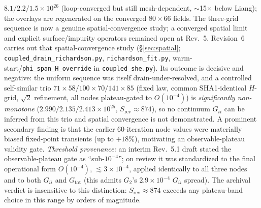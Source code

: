 \documentclass[11pt]{article}
\begin{document}
$8.1/2.2/1.5\times10^{26}$ (loop-converged but still mesh-dependent, $\sim$15$\times$ below Liang);
the overlays are regenerated on the converged $80{\times}66$ fields. The three-grid sequence is now
a genuine spatial-convergence study; a converged spatial limit and explicit surface/impurity
operators remained open at Rev.~5.
Revision~6 carries out that spatial-convergence study (\S\ref{sec:spatial};
\texttt{coupled\_drain\_richardson.py}, \texttt{richardson\_fit.py}, warm-start/\texttt{phi\_span\_H\_override}
in \texttt{coupled\_she.py}). Its outcome is decisive and negative: the uniform sequence was itself
drain-under-resolved, and a controlled self-similar trio $71{\times}58/100{\times}70/141{\times}85$
(fixed law, common SHA1-identical $H$-grid, $\sqrt2$ refinement, all nodes plateau-gated to
$O(10^{-4})$) is \emph{significantly non-monotone} ($2.990/2.135/2.413\times10^{25}$,
$S_{\mathrm{rev}}\approx874$), so no continuum $G_{ii}$ can be inferred from this trio and spatial
convergence is not demonstrated. A prominent secondary finding is that the earlier 60-iteration node
values were materially biased fixed-point transients (up to $+18\%$), motivating an
observable-plateau validity gate. \emph{Threshold provenance:} an interim Rev.~5.1 draft stated the
observable-plateau gate as ``sub-$10^{-4}$''; on review it was standardized to the final operational
form $O(10^{-4})$, $\lesssim3\times10^{-4}$, applied identically to all three nodes and to both
$G_{ii}$ and $G_{\mathrm{tot}}$ (this admits $G_2$'s $2.9\times10^{-4}$ $G_{ii}$ spread). The archival verdict
is insensitive to this distinction: $S_{\mathrm{rev}}\approx874$ exceeds any plateau-band choice in
this range by orders of magnitude.
\end{document}
